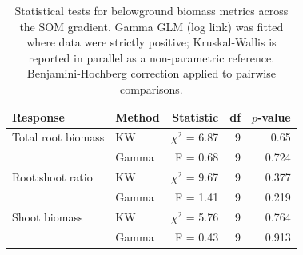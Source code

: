 \begin{table}[htbp]
\centering
\caption{Statistical tests for belowground biomass metrics across the SOM gradient. Gamma GLM (log link) was fitted where data were strictly positive; Kruskal-Wallis is reported in parallel as a non-parametric reference. Benjamini-Hochberg correction applied to pairwise comparisons.}
\label{tab:belowground_stats}
\small
\begin{tabular}{l l r r r}
\toprule
Response & Method & Statistic & df & $p$-value \\
\midrule
Total root biomass & KW & $\chi^2$ = 6.87 & 9 & 0.65 \\
                   & Gamma & F = 0.68 & 9 & 0.724 \\
Root:shoot ratio & KW & $\chi^2$ = 9.67 & 9 & 0.377 \\
                 & Gamma & F = 1.41 & 9 & 0.219 \\
Shoot biomass & KW & $\chi^2$ = 5.76 & 9 & 0.764 \\
              & Gamma & F = 0.43 & 9 & 0.913 \\
\bottomrule
\end{tabular}
\end{table}
